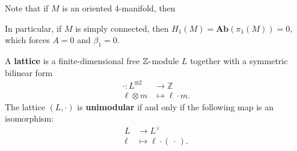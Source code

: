\begin{remark}

Note that if \(M\) is an oriented 4-manifold, then

\begin{center}
\end{center}

In particular, if \(M\) is simply connected, then
\(H_1(M) = {\mathbf{Ab}}(\pi_1(M)) = 0\), which forces \(A = 0\) and
\(\beta_1 = 0\).

\end{remark}

\begin{definition}[Lattice]

A \textbf{lattice} is a finite-dimensional free
\({\mathbb{Z}}{\hbox{-}}\)module \(L\) together with a symmetric
bilinear form
\begin{align*}
\cdot: L^{\otimes 2} &\to {\mathbb{Z}}\\
\ell \otimes m &\mapsto \ell \cdot m
.\end{align*}
The lattice \((L, \cdot)\) is \textbf{unimodular} if and only if the
following map is an isomorphism:
\begin{align*}
L &\to L^\vee\\
\ell &\mapsto \ell \cdot ({\,\cdot\,})
.\end{align*}

\end{definition}


